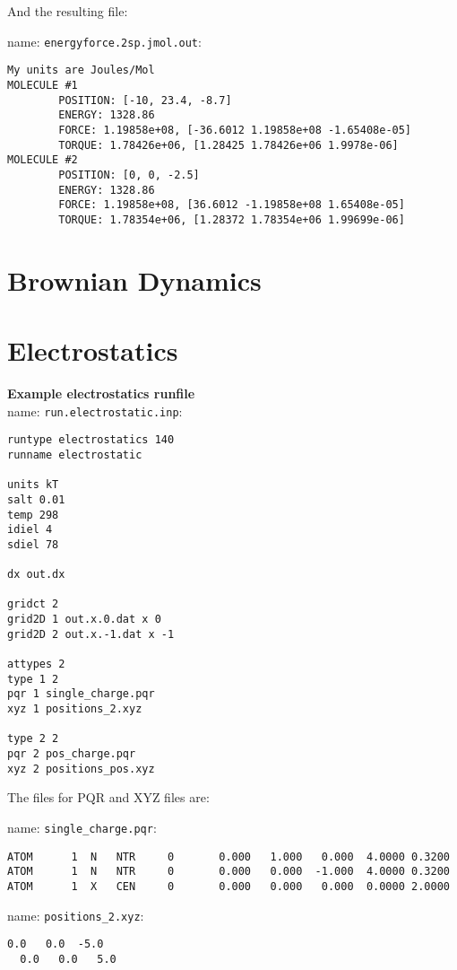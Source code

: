 And the resulting file: 

name: \texttt{energyforce.2sp.jmol.out}:
\begin{lstlisting}[style = MyBash]
My units are Joules/Mol
MOLECULE #1
        POSITION: [-10, 23.4, -8.7]
        ENERGY: 1328.86
        FORCE: 1.19858e+08, [-36.6012 1.19858e+08 -1.65408e-05]
        TORQUE: 1.78426e+06, [1.28425 1.78426e+06 1.9978e-06]
MOLECULE #2
        POSITION: [0, 0, -2.5]
        ENERGY: 1328.86
        FORCE: 1.19858e+08, [36.6012 -1.19858e+08 1.65408e-05]
        TORQUE: 1.78354e+06, [1.28372 1.78354e+06 1.99699e-06]
\end{lstlisting}


\section{Brownian Dynamics}




\section{Electrostatics}

\textbf{Example electrostatics runfile} \\

name:  \texttt{run.electrostatic.inp}:
\begin{lstlisting}[style = MyBash]
runtype electrostatics 140
runname electrostatic

units kT
salt 0.01
temp 298
idiel 4 
sdiel 78

dx out.dx

gridct 2
grid2D 1 out.x.0.dat x 0
grid2D 2 out.x.-1.dat x -1

attypes 2
type 1 2
pqr 1 single_charge.pqr
xyz 1 positions_2.xyz

type 2 2
pqr 2 pos_charge.pqr
xyz 2 positions_pos.xyz
\end{lstlisting}
\medskip

The files for PQR and XYZ files are: 

name:  \texttt{single\_charge.pqr}:
\begin{lstlisting}[style = MyBash]
ATOM      1  N   NTR     0       0.000   1.000   0.000  4.0000 0.3200
ATOM      1  N   NTR     0       0.000   0.000  -1.000  4.0000 0.3200
ATOM      1  X   CEN     0       0.000   0.000   0.000  0.0000 2.0000
\end{lstlisting}

\medskip

name:  \texttt{positions\_2.xyz}:
\begin{lstlisting}[style = MyBash]
  0.0   0.0  -5.0
  0.0   0.0   5.0
\end{lstlisting}
\medskip

